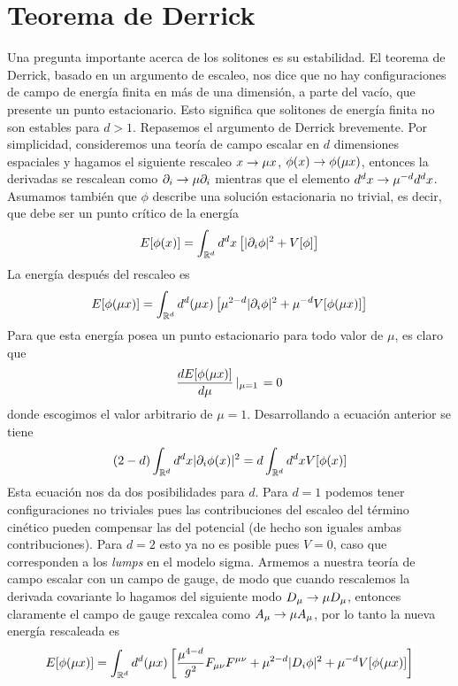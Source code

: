 \section{Teorema de Derrick}

Una pregunta importante acerca de los solitones es su estabilidad. El teorema de Derrick, basado en un argumento de escaleo, nos dice que no hay configuraciones de campo de energía finita en más de una dimensión, a parte del vacío, que presente un punto estacionario. Esto significa que solitones de energía finita no son estables para $d>1$. Repasemos el argumento de Derrick brevemente. Por simplicidad, consideremos una teoría de campo escalar en $d$ dimensiones espaciales y hagamos el siguiente rescaleo $x\rightarrow \mu x$, $\phi(x)\rightarrow\phi(\mu x)$, entonces la derivadas se rescalean como $\partial_i\rightarrow\mu\partial_i$ mientras que el elemento $d^dx\rightarrow \mu^{-d}d^dx$. Asumamos también que $\phi$ describe una solución estacionaria no trivial, es decir, que debe ser un punto crítico de la energía
\begin{align}
	E[\phi(x)]=\int_{\mathbb{R}^d}d^dx\left[|\partial_i\phi|^2+V[\phi]\right]
\end{align}
La energía después del rescaleo es
\begin{align}
	E[\phi(\mu x)] = \int_{\mathbb{R}^d} d^d(\mu x)\left[\mu^{2-d}|\partial_i\phi|^2+\mu^{-d}V[\phi(\mu x)]\right]
\end{align}
Para que esta energía posea un punto estacionario para todo valor de $\mu$, es claro que
\begin{align}
	\frac{dE[\phi(\mu x)]}{d\mu}\left|_{\mu=1}\right. =0 \label{eq:0.2.0.3}
\end{align}
donde escogimos el valor arbitrario de $\mu=1$. Desarrollando a ecuación anterior se tiene
\begin{align}
	(2-d)\int_{\mathbb{R}^d}d^dx|\partial_i\phi(x)|^2=d\int_{\mathbb{R}^d}d^dxV[\phi(x)]
\end{align}
Esta ecuación nos da dos posibilidades para $d$. Para $d=1$ podemos tener configuraciones no triviales pues las contribuciones del escaleo del término cinético pueden compensar las del potencial (de hecho son iguales ambas contribuciones). Para $d=2$ esto ya no es posible pues $V=0$, caso que corresponden a los \emph{lumps} en el modelo sigma. Armemos a nuestra teoría de campo escalar con un campo de gauge, de modo que cuando rescalemos la derivada covariante lo hagamos del siguiente modo $D_\mu\rightarrow\mu D_\mu$, entonces claramente el campo de gauge rexcalea como $A_\mu\rightarrow\mu A_\mu$, por lo tanto la nueva energía rescaleada es
\begin{align}
	E[\phi(\mu x)] = \int_{\mathbb{R}^d} d^d(\mu x)\left[\frac{\mu^{4-d}}{g^2}F_{\mu\nu}F^{\mu\nu}+\mu^{2-d}|D_i\phi|^2+\mu^{-d}V[\phi(\mu x)]\right]
\end{align}
